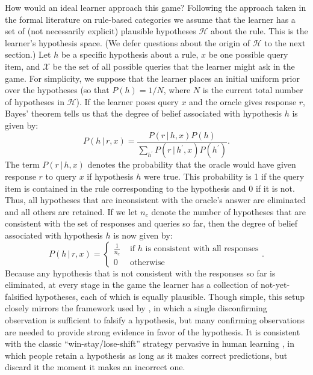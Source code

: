 \documentclass{apa}
\newcommand{\given}{\, | \,}
\newcommand{\ruleset}{\mathcal{H}}
\newcommand{\p}{P}
\begin{document}
How would an ideal learner approach this game? Following the approach taken in the formal literature on rule-based categories \cite{Nosofsky1994a,Ashby1988,goodmanetal08,Erickson1998} we assume that the learner has a set of (not necessarily explicit) plausible hypotheses $\ruleset$ about the rule. This is the learner's hypothesis space. (We defer questions about the origin of $\ruleset$ to the next section.) Let $h$ be a specific hypothesis about a rule, $x$ be one possible query item, and $\mathcal{X}$ be the set of all possible queries that the learner might ask in the game. For simplicity, we suppose that the learner places an initial uniform prior over the hypotheses (so that $\p(h) = 1/N$, where $N$ is the current total number of hypotheses in $\mathcal{H}$).  If the learner poses query $x$ and the oracle gives response $r$, Bayes' theorem tells us that the degree of belief associated with hypothesis $h$ is given by:
\begin{equation}
\p(h \given r,x) = \frac{\p(r \given h,x) \p(h)}{\sum_{h^\prime} \p(r \given h^\prime,x) \p(h^\prime)}.\label{likelihood}
\end{equation}
The term $\p(r \given h,x)$ denotes the probability that the oracle would have given response $r$ to query $x$ if hypothesis $h$ were true. This probability is 1 if the query item is contained in the rule corresponding to the hypothesis and 0 if it is not.  Thus, all hypotheses that are inconsistent with the oracle's answer are eliminated and all others are retained.  If we let $n_c$ denote the number of hypotheses that are consistent with the set of responses and queries so far, then the degree of belief associated with hypothesis $h$ is now given by:
\begin{equation}
\p(h \given r, x) = \left\{ \begin{array}{cl} \frac{1}{n_c} & \mbox{ if $h$ is consistent with all responses} \\ 0 & \mbox{ otherwise} \end{array} \right. .
\end{equation}
\noindent
Because any hypothesis that is not consistent with the responses so far is eliminated, at every stage in the game the learner has a collection of not-yet-falsified hypotheses, each of which is equally plausible. Though simple, this setup closely mirrors the framework used by , in which a single disconfirming observation is sufficient to falsify a hypothesis, but many confirming observations are needed to provide strong evidence in favor of the hypothesis. It is consistent with the classic ``win-stay/lose-shift'' strategy pervasive in human learning \cite{Goodnow1955,Levine1959,brown74}, in which people retain a hypothesis as long as it makes correct predictions, but discard it the moment it makes an incorrect one.
\end{document}
